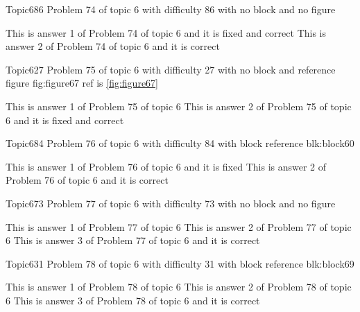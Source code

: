 \documentclass[master]{exam}
\begin{document}
\begin{problem}{Topic6}{86}
	Problem 74 of topic 6 with difficulty 86 with no block and no figure
	\begin{answers}
		 This is answer 1 of Problem 74 of topic 6 and it is fixed and correct
		\answer[correct] This is answer 2 of Problem 74 of topic 6 and it is correct
	\end{answers}
\end{problem}

\begin{problem}{Topic6}{27}
	Problem 75 of topic 6 with difficulty 27 with no block and reference figure fig:figure67 ref is \ref{fig:figure67}
	\begin{answers}
		\answer This is answer 1 of Problem 75 of topic 6 
		 This is answer 2 of Problem 75 of topic 6 and it is fixed and correct
	\end{answers}
\end{problem}

\begin{problem}[requires=blk:block60]{Topic6}{84}
	Problem 76 of topic 6 with difficulty 84 with block reference blk:block60
	\begin{answers}
		\answer[fixed] This is answer 1 of Problem 76 of topic 6 and it is fixed
		\answer[correct] This is answer 2 of Problem 76 of topic 6 and it is correct
	\end{answers}
\end{problem}

\begin{problem}{Topic6}{73}
	Problem 77 of topic 6 with difficulty 73 with no block and no figure
	\begin{answers}
		\answer This is answer 1 of Problem 77 of topic 6 
		\answer This is answer 2 of Problem 77 of topic 6 
		\answer[correct] This is answer 3 of Problem 77 of topic 6 and it is correct
	\end{answers}
\end{problem}

\begin{problem}[requires=blk:block69]{Topic6}{31}
	Problem 78 of topic 6 with difficulty 31 with block reference blk:block69
	\begin{answers}
		\answer This is answer 1 of Problem 78 of topic 6 
		\answer This is answer 2 of Problem 78 of topic 6 
		\answer[correct] This is answer 3 of Problem 78 of topic 6 and it is correct
	\end{answers}
\end{problem}
\end{document}
